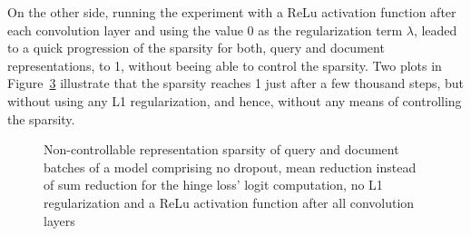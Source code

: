 On the other side, running the experiment with a ReLu activation function after each convolution layer
    and using the value 0 as the regularization term $\lambda$, leaded to a
    quick progression of the sparsity for both, query and document representations, to 1,
    without beeing able to control the sparsity.
Two plots in Figure~\ref{fig:2020-03-08:relu-all:cost-fn-query-doc-repr-sparsity} illustrate
    that the sparsity reaches 1 just after a few thousand steps, but without using any
    L1 regularization, and hence, without any means of controlling the sparsity.

\begin{figure}[htbp]
\centering
\begin{subfigure}[b]{0.45\textwidth}
    \centering
    \label{fig:2020-03-08:relu-all:sparsity-query-repr}
\end{subfigure}
\hspace{0.042\textwidth}
\begin{subfigure}[b]{0.45\textwidth}
    \centering
    \label{fig:2020-03-08:relu-all:sparsity-doc-repr}
\end{subfigure}
\caption[Non-controllable sparsity of a model comprising sum reduction for hinge loss' logits computation, no dropout, no L1 regularization and ReLu after all convolution layers]{Non-controllable representation sparsity of query and document batches of a model comprising no dropout, mean reduction instead of sum reduction for the hinge loss' logit computation, no L1 regularization and a ReLu activation function after all convolution layers}
\label{fig:2020-03-08:relu-all:cost-fn-query-doc-repr-sparsity} %
\end{figure}

